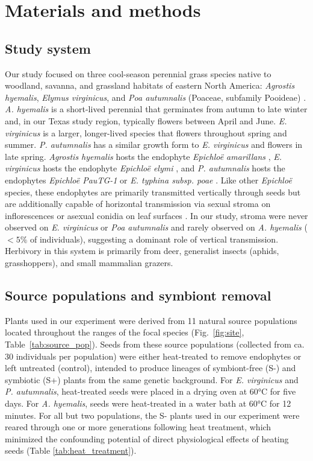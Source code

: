 \documentclass[12pt]{article}\usepackage[]{graphicx}\usepackage[dvipsnames]{xcolor}
\begin{document}
\section*{Materials and methods}
\subsection*{Study system}
Our study focused on three cool-season perennial grass species native to woodland, savanna, and grassland habitats of eastern North America: \emph{Agrostis hyemalis}, \emph{Elymus virginicus}, and \emph{Poa autumnalis} (Poaceae, subfamily Pooideae) \citep{shaw2011guide}.
\emph{A. hyemalis} is a short-lived perennial that germinates from autumn to late winter and, in our Texas study region, typically flowers between April and June. 
\emph{E. virginicus} is a larger, longer-lived species that flowers throughout spring and summer. 
\emph{P. autumnalis} has a similar growth form to \emph{E. virginicus} and flowers in late spring. 
\emph{Agrostis hyemalis} hosts the endophyte \emph{Epichloë amarillans} \citep{white1994endophyte}, \emph{E. virginicus} hosts the endophyte \emph{Epichloë elymi} \citep{liu2023fungi}, and \emph{P. autumnalis} hosts the endophytes \emph{Epichloë PauTG-1} or \emph{E. typhina subsp. poae} \citep{gundel2020simulated}.
Like other \emph{Epichloë} species, these endophytes are primarily transmitted vertically through seeds but are additionally capable of horizontal transmission via sexual stroma on inflorescences or asexual conidia on leaf surfaces \citep{clay2002evolutionary, gundel2020simulated,leuchtmann2014nomenclatural}. 
In our study, stroma were never observed on \emph{E. virginicus} or \emph{Poa autumnalis} and rarely observed on \emph{A. hyemalis} ($<5\%$ of individuals), suggesting a dominant role of vertical transmission.
Herbivory in this system is primarily from deer, generalist insects (aphids, grasshoppers), and small mammalian grazers. 

\subsection*{Source populations and symbiont removal}
Plants used in our experiment were derived from 11 natural source populations located throughout the ranges of the focal species (Fig.~\ref{fig:site}, Table~\ref{tab:source_pop}). 
Seeds from these source populations (collected from ca. 30 individuals per population) were either heat-treated to remove endophytes or left untreated (control), intended to produce lineages of symbiont-free (S-) and symbiotic (S+) plants from the same genetic background. 
For \emph{E. virginicus} and \emph{P. autumnalis}, heat-treated seeds were placed in a drying oven at 60°C for five days. 
For \emph{A. hyemalis}, seeds were heat-treated in a water bath at 60°C for 12 minutes.
For all but two populations, the S- plants used in our experiment were reared through one or more generations following heat treatment, which minimized the confounding potential of direct physiological effects of heating seeds (Table \ref{tab:heat_treatment}). 
\end{document}
